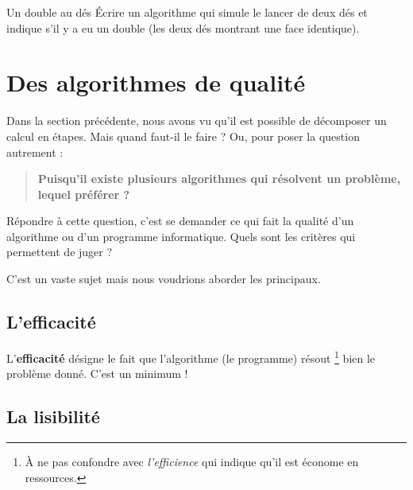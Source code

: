 			\begin{Exercice}{Un double au dés}
				Écrire un algorithme qui simule le lancer de deux dés
				et indique s'il y a eu un double 
				(les deux dés montrant une face identique).
			\end{Exercice}
			 		 
	\section{Des algorithmes de qualité}
	
		Dans la section précédente,
		nous avons vu qu'il est possible de décomposer un calcul en étapes.
		Mais quand faut-il le faire ?	
		Ou, pour poser la question autrement :
		
			\begin{quote}
				\textbf{Puisqu'il existe plusieurs algorithmes 
				qui résolvent un problème, lequel préférer ?}
			\end{quote}
		
		Répondre à cette question, 
		c'est se demander ce qui fait la qualité d'un algorithme
		ou d'un programme informatique.
		Quels sont les critères qui permettent de juger ?
		
		C'est un vaste sujet mais nous voudrions aborder les principaux.
		
		\subsection{L'efficacité}
			
			L'\textbf{efficacité}
			désigne le fait que l'algorithme (le programme) résout%
			\footnote{%
				À ne pas confondre avec \emph{l'efficience}
				qui indique qu'il est économe en ressources.
			}
			bien le problème donné.
			C'est un minimum !
		
		\subsection{La lisibilité}
		
